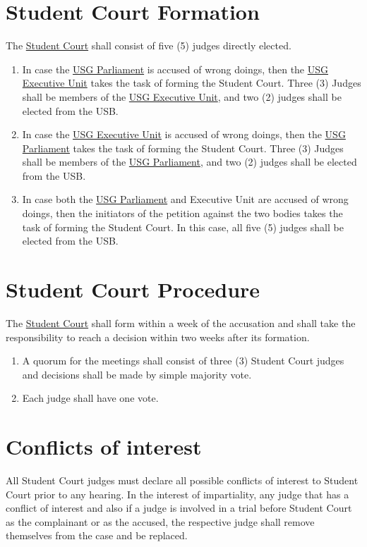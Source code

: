\documentclass[12pt]{LaTeX_Misc/constitution}
\begin{document}
\section{Student Court Formation}
The \hyperref[StudentCourtDef]{Student Court} shall consist of five (5) judges directly elected.
\begin{enumerate}[label={\textbf{\S\arabic*}}]
    \item In case the \hyperref[USGParliamentDef]{USG Parliament} is accused of wrong doings, then the \hyperref[USGexecutiveUnitDef]{USG Executive Unit} takes the task of forming the Student Court. Three (3) Judges shall be members of the \hyperref[USGexecutiveUnitDef]{USG Executive Unit}, and two (2) judges shall be elected from the USB.
    
    \item In case the \hyperref[USGexecutiveUnitDef]{USG Executive Unit} is accused of wrong doings, then the \hyperref[USGParliamentDef]{USG Parliament} takes the task of forming the Student Court. Three (3) Judges shall be members of the \hyperref[USGParliamentDef]{USG Parliament}, and two (2) judges shall be elected from the USB.
    
    \item In case both the \hyperref[USGParliamentDef]{USG Parliament} and Executive Unit are accused of wrong doings, then the initiators of the petition against the two bodies takes the task of forming the Student Court. In this case, all five (5) judges shall be elected from the USB.
\end{enumerate}



\section{Student Court Procedure}
The \hyperref[StudentCourtDef]{Student Court} shall form within a week of the accusation and shall take the responsibility to reach a decision within two weeks after its formation. 
\begin{enumerate}[label={\textbf{\S\arabic*}}]
    \item A quorum for the meetings shall consist of three (3) Student Court judges and decisions shall be made by simple majority vote.
    \item Each judge shall have one vote.
\end{enumerate}


\section{Conflicts of interest}
All Student Court judges must declare all possible conflicts of interest to Student Court prior to any hearing. In the interest of impartiality, any judge that has a conflict of interest and also if a judge is involved in a trial before Student Court as the complainant or as the accused, the respective judge shall remove themselves from the case and be replaced.
\end{document}

